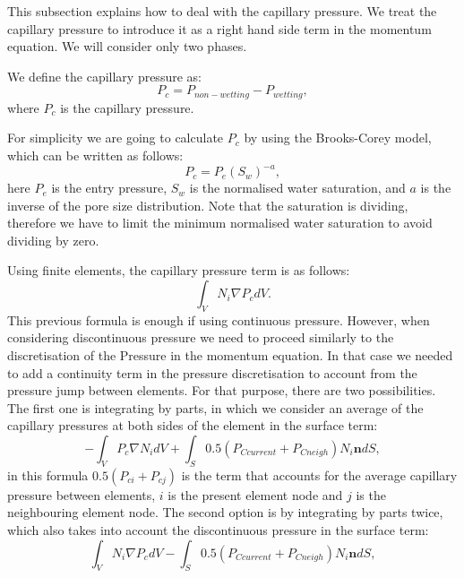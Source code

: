 This subsection explains how to deal with the capillary pressure. We treat the capillary pressure to introduce it as a right hand side term in the momentum equation. We will consider only two phases.

We define the capillary pressure as:
\begin{equation}
P_c = P_{non-wetting} - P_{wetting},
\end{equation}
where $P_c $ is the capillary pressure.

For simplicity we are going to calculate $P_c $ by using the Brooks-Corey model, which can be written as follows:
\begin{equation}
P_c = P_e (S_w)^{-a},
\end{equation}
here $P_e$ is the entry pressure, $S_w $ is the normalised water saturation, and $a $ is the inverse of the pore size distribution. Note that the saturation is dividing, therefore we have to limit the minimum normalised water saturation to avoid dividing by zero.

Using finite elements, the capillary pressure term is as follows:
\begin{equation}
\int_V N_i \nabla P_c dV.
\label{Cap_pressure_initial}
\end{equation}
This previous formula is enough if using continuous pressure. However, when considering discontinuous pressure we need to proceed similarly to the discretisation of the Pressure in the momentum equation. In that case we needed to add a continuity term in the pressure discretisation to account from the pressure jump between elements. For that purpose, there are two possibilities. The first one is integrating by parts, in which we consider an average of the capillary pressures at both sides of the element in the surface term:
\begin{equation}
-\int_V P_c \nabla N_{i} dV + \int_S 0.5 (P_{Ccurrent} + P_{Cneigh})  N_{i} \mathbf{n} dS,
\label{cappressure_intbyparts1}
\end{equation}
in this formula $ 0.5 (P_{ci} + P_{cj})$ is the term that accounts for the average capillary pressure between elements, $i$ is the present element node and $j$ is the neighbouring element node. The second option is by integrating by parts twice, which also takes into account the discontinuous pressure in the surface term:
\begin{equation}
\int_V N_{i} \nabla P_c dV - \int_S 0.5 (P_{Ccurrent} + P_{Cneigh})  N_{i} \mathbf{n} dS,
\label{cappressure_intbyparts2}
\end{equation}

